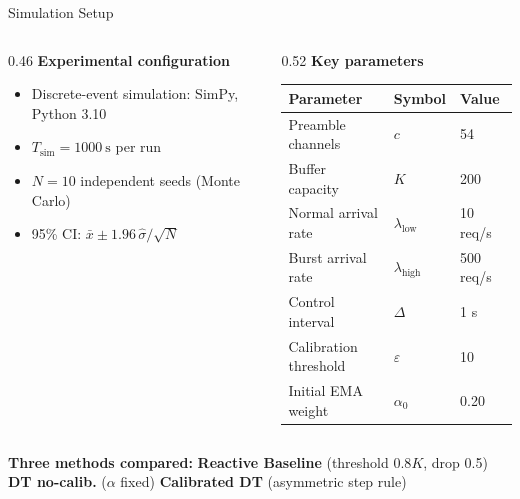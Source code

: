 \documentclass[aspectratio=169,t]{beamer}
\begin{document}
\begin{frame}{Simulation Setup}

  \begin{columns}[T]
    \begin{column}{0.46\textwidth}
      \textbf{Experimental configuration}

      \vspace{4pt}
      \begin{itemize}\setlength\itemsep{3pt}
        \item Discrete-event simulation: SimPy, Python 3.10
        \item $T_{\mathrm{sim}} = 1000\ \mathrm{s}$ per run
        \item $N = 10$ independent seeds (Monte Carlo)
        \item 95\% CI: $\bar{x} \pm 1.96\,\hat\sigma/\sqrt{N}$
      \end{itemize}
    \end{column}

    \begin{column}{0.52\textwidth}
      \textbf{Key parameters}

      \vspace{4pt}
      \renewcommand{\arraystretch}{1.15}
      \begin{tabular}{lll}
        \toprule
        Parameter & Symbol & Value \\
        \midrule
        Preamble channels & $c$ & 54 \\
        Buffer capacity & $K$ & 200 \\
        Normal arrival rate & $\lambda_{\mathrm{low}}$ & 10 req/s \\
        Burst arrival rate & $\lambda_{\mathrm{high}}$ & 500 req/s \\
        Control interval & $\Delta$ & 1 s \\
        Calibration threshold & $\varepsilon$ & 10 \\
        Initial EMA weight & $\alpha_0$ & 0.20 \\
        \bottomrule
      \end{tabular}
    \end{column}
  \end{columns}

  \vspace{6pt}
  \textbf{Three methods compared:}\quad
  \textcolor{alertorange}{\textbf{Reactive Baseline}} (threshold $0.8K$, drop 0.5)\quad
  \textcolor{ITUblue!70}{\textbf{DT no-calib.}} ($\alpha$ fixed)\quad
  \textcolor{ITUblue}{\textbf{Calibrated DT}} (asymmetric step rule)

\end{frame}
\end{document}
